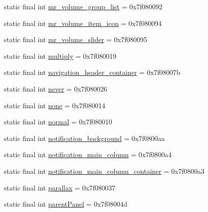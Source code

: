 \begin{CompactItemize}
\item 
static final int \hyperlink{classandroid_1_1support_1_1graphics_1_1drawable_1_1_r_1_1id_d1f956e483cd2f2839d21e5e59ba449c}{mr\_\-volume\_\-group\_\-list} = 0x7f080092
\item 
static final int \hyperlink{classandroid_1_1support_1_1graphics_1_1drawable_1_1_r_1_1id_5199c1297444d93a3db4ba5fb0a5c495}{mr\_\-volume\_\-item\_\-icon} = 0x7f080094
\item 
static final int \hyperlink{classandroid_1_1support_1_1graphics_1_1drawable_1_1_r_1_1id_2c7e604f775eb5b97cc9ac344c5fbc46}{mr\_\-volume\_\-slider} = 0x7f080095
\item 
static final int \hyperlink{classandroid_1_1support_1_1graphics_1_1drawable_1_1_r_1_1id_54a47700a13058254f2159ae03887ee9}{multiply} = 0x7f080019
\item 
static final int \hyperlink{classandroid_1_1support_1_1graphics_1_1drawable_1_1_r_1_1id_0b57b0f98c18295091b78cb8b236fabd}{navigation\_\-header\_\-container} = 0x7f08007b
\item 
static final int \hyperlink{classandroid_1_1support_1_1graphics_1_1drawable_1_1_r_1_1id_024494faf0317969fe6f79834ea7e4ad}{never} = 0x7f080026
\item 
static final int \hyperlink{classandroid_1_1support_1_1graphics_1_1drawable_1_1_r_1_1id_ff4ee6510135d7e38509e023b72ec959}{none} = 0x7f080014
\item 
static final int \hyperlink{classandroid_1_1support_1_1graphics_1_1drawable_1_1_r_1_1id_bca95a7b73ad723098aa93ff22fd5df6}{normal} = 0x7f080010
\item 
static final int \hyperlink{classandroid_1_1support_1_1graphics_1_1drawable_1_1_r_1_1id_417a65a94ea26755ff1d46daa6ae3c13}{notification\_\-background} = 0x7f0800aa
\item 
static final int \hyperlink{classandroid_1_1support_1_1graphics_1_1drawable_1_1_r_1_1id_6bed3ae4e3d64c9d356c8d20553b768e}{notification\_\-main\_\-column} = 0x7f0800a4
\item 
static final int \hyperlink{classandroid_1_1support_1_1graphics_1_1drawable_1_1_r_1_1id_a3702dda89ae232d04072e32765cfa54}{notification\_\-main\_\-column\_\-container} = 0x7f0800a3
\item 
static final int \hyperlink{classandroid_1_1support_1_1graphics_1_1drawable_1_1_r_1_1id_94fae4a5d50a99bc95409246c44d61a7}{parallax} = 0x7f080037
\item 
static final int \hyperlink{classandroid_1_1support_1_1graphics_1_1drawable_1_1_r_1_1id_641f865af46d889eb08e5aa95f848279}{parentPanel} = 0x7f08004d

\end{CompactItemize}

